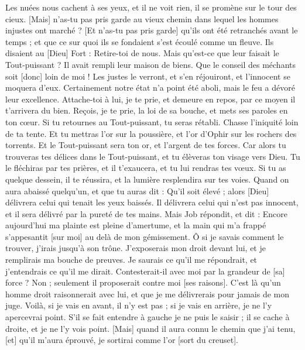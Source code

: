 \begin{multicols}{2}
Les nuées nous cachent à ses yeux, et il ne voit rien, il se promène sur le tour des cieux.
[Mais] n'as-tu pas pris garde au vieux chemin dans lequel les hommes injustes ont marché ?
[Et n'as-tu pas pris garde] qu'ils ont été retranchés avant le temps ; et que ce sur quoi ils se fondaient s'est écoulé comme un fleuve.
Ils disaient au [Dieu] Fort : Retire-toi de nous. Mais qu'est-ce que leur faisait le Tout-puissant ?
Il avait rempli leur maison de biens. Que le conseil des méchants soit [donc] loin de moi !
Les justes le verront, et s'en réjouiront, et l'innocent se moquera d'eux.
Certainement notre état n'a point été aboli, mais le feu a dévoré leur excellence.
Attache-toi à lui, je te prie, et demeure en repos, par ce moyen il t'arrivera du bien.
Reçois, je te prie, la loi de sa bouche, et mets ses paroles en ton cœur.
Si tu retournes au Tout-puissant, tu seras rétabli. Chasse l'iniquité loin de ta tente.
Et tu mettras l'or sur la poussière, et l'or d'Ophir sur les rochers des torrents.
Et le Tout-puissant sera ton or, et l'argent de tes forces.
Car alors tu trouveras tes délices dans le Tout-puissant, et tu élèveras ton visage vers Dieu.
Tu le fléchiras par tes prières, et il t'exaucera, et tu lui rendras tes vœux.
Si tu as quelque dessein, il te réussira, et la lumière resplendira sur tes voies.
Quand on aura abaissé quelqu'un, et que tu auras dit : Qu'il soit élevé ; alors [Dieu] délivrera celui qui tenait les yeux baissés.
Il délivrera celui qui n'est pas innocent, et il sera délivré par la pureté de tes mains.
\VerseOne{}Mais Job répondit, et dit :
Encore aujourd'hui ma plainte est pleine d'amertume, et la main qui m'a frappé s'appesantit [sur moi] au delà de mon gémissement.
Ô si je savais comment le trouver, j'irais jusqu'à son trône.
J'exposerais mon droit devant lui, et je remplirais ma bouche de preuves.
Je saurais ce qu'il me répondrait, et j'entendrais ce qu'il me dirait.
Contesterait-il avec moi par la grandeur de [sa] force ? Non ; seulement il proposerait contre moi [ses raisons].
C'est là qu'un homme droit raisonnerait avec lui, et que je me délivrerais pour jamais de mon juge.
Voilà, si je vais en avant, il n'y est pas ; si je vais en arrière, je ne l'y apercevrai point.
S'il se fait entendre à gauche je ne puis le saisir ; il se cache à droite, et je ne l'y vois point.
[Mais] quand il aura connu le chemin que j'ai tenu, [et] qu'il m'aura éprouvé, je sortirai comme l'or [sort du creuset].

\end{multicols}

